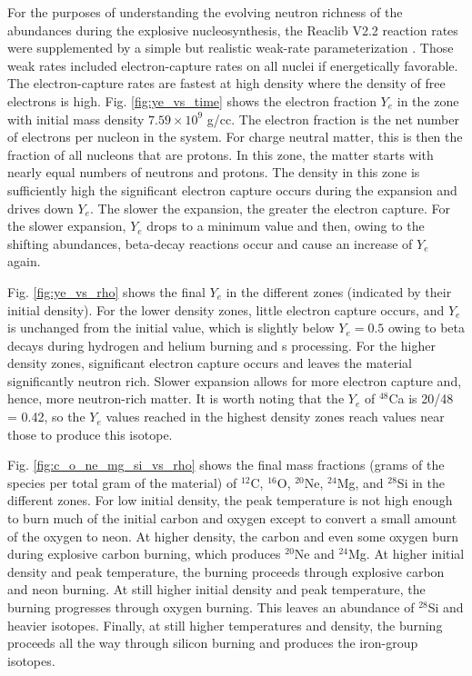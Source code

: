 \documentclass[preprint]{revtex4-2}
\begin{document}
For the purposes of understanding the evolving neutron richness of the
abundances during the explosive nucleosynthesis, the Reaclib V2.2
reaction rates were supplemented by a simple but realistic
weak-rate parameterization \cite{2010A&A...522A..25A}.  Those weak rates
included electron-capture rates on all nuclei if energetically favorable.
The electron-capture rates are fastest at high density where the density
of free electrons is high.  Fig. \ref{fig:ye_vs_time} shows the electron
fraction $Y_e$ in the zone with initial mass density $7.59 \times 10^9$ g/cc.
The electron fraction is the net number of electrons per nucleon in the system.
For charge neutral matter, this is then the fraction of all nucleons that
are protons.  In this zone, the matter starts with nearly equal numbers of
neutrons and protons.  
The density in this zone
is sufficiently high the significant electron capture occurs during the
expansion and drives down $Y_e$.  The slower the expansion, the greater
the electron capture.  For the slower expansion, $Y_e$ drops to a minimum
value and then, owing to the shifting abundances, beta-decay reactions
occur and cause an increase of $Y_e$ again.

Fig. \ref{fig:ye_vs_rho} shows the final $Y_e$ in the different zones
(indicated by their initial density).
For the lower density zones, little electron capture
occurs, and $Y_e$ is unchanged from the initial value, which is slightly
below $Y_e = 0.5$ owing to beta decays during hydrogen and helium burning
and s processing.  For the higher
density zones, significant electron capture occurs and leaves the
material significantly neutron rich.  Slower expansion allows for more
electron capture and, hence, more neutron-rich matter.
It is worth noting that the $Y_e$ of $^{48}$Ca is 20/48 = 0.42, so the
$Y_e$ values reached in the highest density zones reach values near those
to produce this isotope.

Fig. \ref{fig:c_o_ne_mg_si_vs_rho} shows the final mass fractions (grams 
of the species per total gram of the material) of
$^{12}$C, $^{16}$O, $^{20}$Ne, $^{24}$Mg, and $^{28}$Si in the different
zones.
For low initial density, the peak temperature is not
high enough to burn much of the initial carbon and oxygen except to 
convert a small amount of the oxygen to neon.  At higher
density, the carbon and even some oxygen burn during explosive carbon
burning, which produces $^{20}$Ne and $^{24}$Mg.  At higher initial density
and peak temperature, the burning proceeds through explosive carbon and
neon burning.  At still higher initial density and peak temperature,
the burning progresses through oxygen burning.  This leaves an abundance
of $^{28}$Si and heavier isotopes.  Finally, at still higher temperatures
and density, the burning proceeds all the way through silicon burning
and produces the iron-group isotopes.
\end{document}
